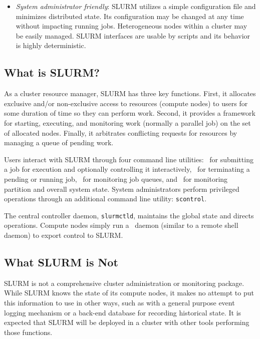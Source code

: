 \documentclass[10pt,onecolumn,times]{../common/llncs}
\begin{document}
{\begin{itemize}
\item {\em System administrator friendly}: SLURM utilizes
a simple configuration file and minimizes distributed state.
Its configuration may be changed at any time without impacting running
jobs.  Heterogeneous nodes within a cluster may be easily managed.  SLURM
interfaces are usable by scripts and its behavior is highly deterministic.

\end{itemize}

\subsection{What is SLURM?}

As a cluster resource manager, SLURM has three key functions.  First,
it allocates exclusive and/or non-exclusive access to resources (compute
nodes) to users for some duration of time so they can perform work.
Second, it provides a framework for starting, executing, and monitoring
work (normally a parallel job) on the set of allocated nodes.  Finally,
it arbitrates conflicting requests for resources by managing a queue of
pending work.

Users interact with SLURM through four command line utilities: \srun\
for submitting a job for execution and optionally controlling it
interactively, \scancel\ for terminating a pending or running job,
\squeue\ for monitoring job queues, and \sinfo\ for monitoring partition
and overall system state.  System administrators perform privileged
operations through an additional command line utility: {\tt scontrol}.

The central controller daemon, {\tt slurmctld}, maintains the global
state and directs operations.  Compute nodes simply run a \slurmd\ daemon
(similar to a remote shell daemon) to export control to SLURM.

\subsection{What SLURM is Not}

SLURM is not a comprehensive cluster administration or monitoring package.
While SLURM knows the state of its compute nodes, it makes no attempt
to put this information to use in other ways, such as with a general
purpose event logging mechanism or a back-end database for recording
historical state.  It is expected that SLURM will be deployed in a
cluster with other tools performing those functions.

}
\end{document}
